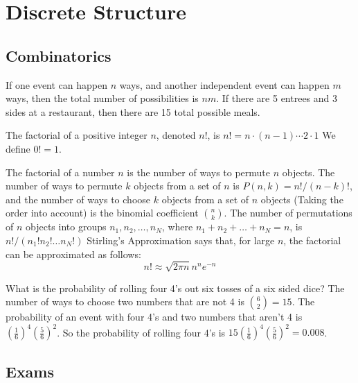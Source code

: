 \chapter{Discrete Structure}
    \section{Combinatorics}
        If one event can happen $n$ ways, and another independent
        event can happen $m$ ways, then the total number
        of possibilities is $nm$. If there are 5 entrees
        and 3 sides at a restaurant, then there are
        15 total possible meals.
        \begin{definition}
            The factorial of a positive integer $n$, denoted $n!$, is
            $n!=n\cdot(n-1)\cdots{2}\cdot{1}$ We define $0!=1$.
        \end{definition}
        The factorial of a number $n$ is the number of ways to permute $n$
        objects. The number of ways to permute $k$ objects from a set of $n$ is
        $P(n,k)=n!/(n-k)!$, and the number of ways to choose $k$ objects from a
        set of $n$ objects (Taking the order into account) is the binomial
        coefficient $\binom{n}{k}$. The number of permutations of $n$ objects
        into groups $n_{1},n_{2},\hdots,n_{N}$, where
        $n_{1}+n_{2}+\hdots+n_{N}=n$, is $n!/(n_{1}!n_{2}!\hdots{n_{N}!})$
        Stirling's Approximation says that, for large $n$, the factorial can be
        approximated as follows:
        \begin{equation}
            n!\approx\sqrt{2\pi{n}}n^{n}e^{-n}
        \end{equation}
        \begin{example}
            What is the probability of rolling four 4's out six tosses of a six
            sided dice? The number of ways to choose two numbers that are not 4
            is $\binom{6}{2}=15$. The probability of an event with four 4's and
            two numbers that aren't 4 is $(\frac{1}{6})^{4}(\frac{5}{6})^{2}$.
            So the probability of rolling four 4's is
            $15(\frac{1}{6})^{4}(\frac{5}{6})^{2}=0.008$.
        \end{example}
    \section{Exams}
